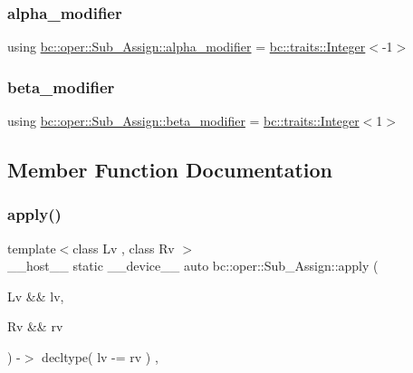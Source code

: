 \subsubsection{\texorpdfstring{alpha\+\_\+modifier}{alpha\_modifier}}
{\footnotesize\ttfamily using \hyperlink{structbc_1_1oper_1_1Sub__Assign_a7fc93564b8729fb040da5b04b4a010c4}{bc\+::oper\+::\+Sub\+\_\+\+Assign\+::alpha\+\_\+modifier} =  \hyperlink{structbc_1_1traits_1_1Integer}{bc\+::traits\+::\+Integer}$<$-\/1$>$}

\mbox{\label{structbc_1_1oper_1_1Sub__Assign_a128370b03a4a09e7a80dc8ccae9ad8de}} 
\subsubsection{\texorpdfstring{beta\+\_\+modifier}{beta\_modifier}}
{\footnotesize\ttfamily using \hyperlink{structbc_1_1oper_1_1Sub__Assign_a128370b03a4a09e7a80dc8ccae9ad8de}{bc\+::oper\+::\+Sub\+\_\+\+Assign\+::beta\+\_\+modifier} =  \hyperlink{structbc_1_1traits_1_1Integer}{bc\+::traits\+::\+Integer}$<$1$>$}



\subsection{Member Function Documentation}
\mbox{\label{structbc_1_1oper_1_1Sub__Assign_ab2173e9d8672bce4eb744d57092c6f1c}} 
\subsubsection{\texorpdfstring{apply()}{apply()}}
{\footnotesize\ttfamily template$<$class Lv , class Rv $>$ \\
\+\_\+\+\_\+host\+\_\+\+\_\+ static \+\_\+\+\_\+device\+\_\+\+\_\+ auto bc\+::oper\+::\+Sub\+\_\+\+Assign\+::apply (\begin{DoxyParamCaption}\item[{Lv \&\&}]{lv,  }\item[{Rv \&\&}]{rv }\end{DoxyParamCaption}) -\/$>$ decltype( lv -\/= rv ) \hspace{0.3cm}{\ttfamily [inline]}, {\ttfamily [static]}}

